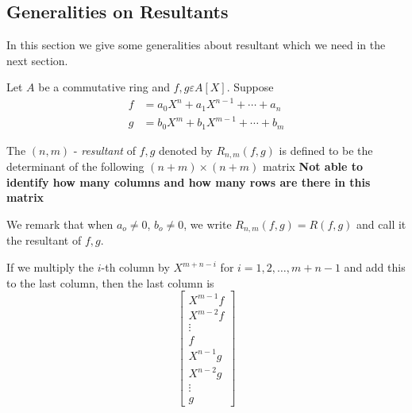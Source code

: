 \chapter{}\label{chap2}

\section{Generalities on Resultants}\label{c2:s1}

In this section we give some generalities about resultant which we
need in the next section.

Let $A$ be a commutative ring and $f,g \varepsilon A[X]$. Suppose
\begin{align*}
f&=a_0X^{n}+a_1X^{n-1}+\cdots+a_n\\
g&=b_0X^{m}+b_1X^{m-1}+\cdots+b_m
\end{align*}

\begin{dfn}\label{c2:dfn1.1}
The $(n,m)$ - \textit{resultant} of $f,g$ denoted by $R_{n,m}(f,g)$
is defined to be the determinant of the following $(n+m)\times (n+m)$
matrix
{\large\bf Not able to identify how many columns and how many rows are
there in this matrix}


We remark that when $a_o\neq 0$, $b_o\neq 0$, we write
$R_{n,m}(f,g)=R(f,g)$ and call it the resultant of $f,g$.
\end{dfn}

If we multiply the $i$-th column by $X^{m+n-i}$ for
$i=1,2,\ldots,m+n-1$ and add this to the last column, then the last
column is
$$
\begin{bmatrix}
X^{m-1}f\\
X^{m-2}f\\
\vdots\\
f\\
X^{n-1}g\\
X^{n-2}g\\
\vdots\\
g
\end{bmatrix}
$$

